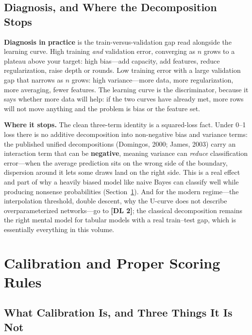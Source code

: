 \subsection{Diagnosis, and Where the Decomposition Stops}

\textbf{Diagnosis in practice} is the train-versus-validation gap read alongside the learning curve. High training \textit{and} validation error, converging as $n$ grows to a plateau above your target: high bias---add capacity, add features, reduce regularization, raise depth or rounds. Low training error with a large validation gap that narrows as $n$ grows: high variance---more data, more regularization, more averaging, fewer features. The learning curve is the discriminator, because it says whether more data will help: if the two curves have already met, more rows will not move anything and the problem is bias or the feature set.

\textbf{Where it stops.} The clean three-term identity is a squared-loss fact. Under 0--1 loss there is no additive decomposition into non-negative bias and variance terms: the published unified decompositions (Domingos, 2000; James, 2003) carry an interaction term that can be \textbf{negative}, meaning variance can \textit{reduce} classification error---when the average prediction sits on the wrong side of the boundary, dispersion around it lets some draws land on the right side. This is a real effect and part of why a heavily biased model like naive Bayes can classify well while producing nonsense probabilities (Section~\ref{cml:sec:calibration}). And for the modern regime---the interpolation threshold, double descent, why the U-curve does not describe overparameterized networks---go to \textbf{[DL 2]}; the classical decomposition remains the right mental model for tabular models with a real train--test gap, which is essentially everything in this volume.

\section{Calibration and Proper Scoring Rules}
\label{cml:sec:calibration}

\subsection{What Calibration Is, and Three Things It Is Not}

